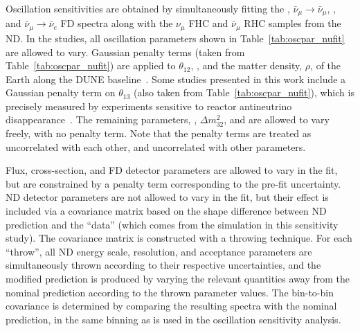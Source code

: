 Oscillation sensitivities are obtained by simultaneously fitting the \numutonumu, $\bar{\nu}_\mu \rightarrow \bar{\nu}_\mu$, \numutonue, and $\bar{\nu}_\mu \rightarrow \bar{\nu}_e$ FD spectra along with the $\nu_{\mu}$ FHC and $\bar{\nu}_{\mu}$ RHC samples from the ND. In the studies, all oscillation parameters shown in Table~\ref{tab:oscpar_nufit} are allowed to vary. Gaussian penalty terms (taken from Table~\ref{tab:oscpar_nufit}) are applied to $\theta_{12}$, , and the matter density, $\rho$, of the Earth along the DUNE baseline~\cite{Roe:2017zdw}. Some studies presented in this work include a Gaussian penalty term on $\theta_{13}$ (also taken from Table~\ref{tab:oscpar_nufit}), which is precisely measured by experiments sensitive to reactor antineutrino disappearance~\cite{Abrahao:2020ztg,Adey:2018zwh,Bak:2018ydk}. The remaining parameters, , $\Delta m^{2}_{32}$, and \deltacp are allowed to vary freely, with no penalty term. Note that the penalty terms are treated as uncorrelated with each other, and uncorrelated with other parameters.

Flux, cross-section, and FD detector parameters are allowed to vary in the fit, but are constrained by a penalty term corresponding to the pre-fit uncertainty. ND detector parameters are not allowed to vary in the fit, but their effect is included via a covariance matrix based on the shape difference between ND prediction and the ``data'' (which comes from the simulation in this sensitivity study). The covariance matrix is constructed with a throwing technique. For each ``throw'', all ND energy scale, resolution, and acceptance parameters are simultaneously thrown according to their respective uncertainties, and the modified prediction is produced by varying the relevant quantities away from the nominal prediction according to the thrown parameter values. The bin-to-bin covariance is determined by comparing the resulting spectra with the nominal prediction, in the same binning as is used in the oscillation sensitivity analysis.

